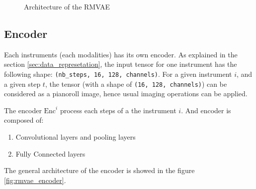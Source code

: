 \documentclass[12pt]{report}
\begin{document}
\begin{figure}
\begin{center}
\caption{Architecture of the RMVAE}
\label{fig:rmvae_architecture}
\end{center}
\end{figure}

\subsection{Encoder}
\label{sec:encoder}

Each instruments (each modalities) has its own encoder.
As explained in the section \ref{sec:data_represetation}, the input tensor for one instrument has the following shape: \texttt{(nb\_steps, 16, 128, channels)}.
For a given instrument $i$, and a given step $t$, the tensor (with a shape of \texttt{(16, 128, channels)}) can be considered as a pianoroll image, hence usual imaging operations can be applied.

The encoder $\text{Enc}^i$ process each steps of a the instrument $i$. And encoder is composed of:
\begin{enumerate}
    \item Convolutional layers and pooling layers
    \item Fully Connected layers
\end{enumerate}
The general architecture of the encoder is showed in the figure \ref{fig:rmvae_encoder}.
\end{document}
